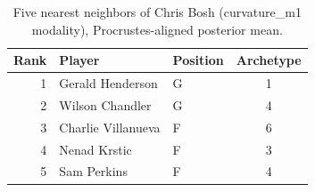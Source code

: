 \begin{table}[htbp]
  \centering\small
  \begin{tabular}{rllc}
    \toprule
    Rank & Player & Position & Archetype \\
    \midrule
    1 & Gerald Henderson & G & 1 \\
    2 & Wilson Chandler & G & 4 \\
    3 & Charlie Villanueva & F & 6 \\
    4 & Nenad Krstic & F & 3 \\
    5 & Sam Perkins & F & 4 \\
    \bottomrule
  \end{tabular}
  \caption{Five nearest neighbors of Chris Bosh (curvature_m1 modality), Procrustes-aligned posterior mean.}
  \label{tab:Chris_Bosh_neighbors_curvature_m1}
\end{table}

